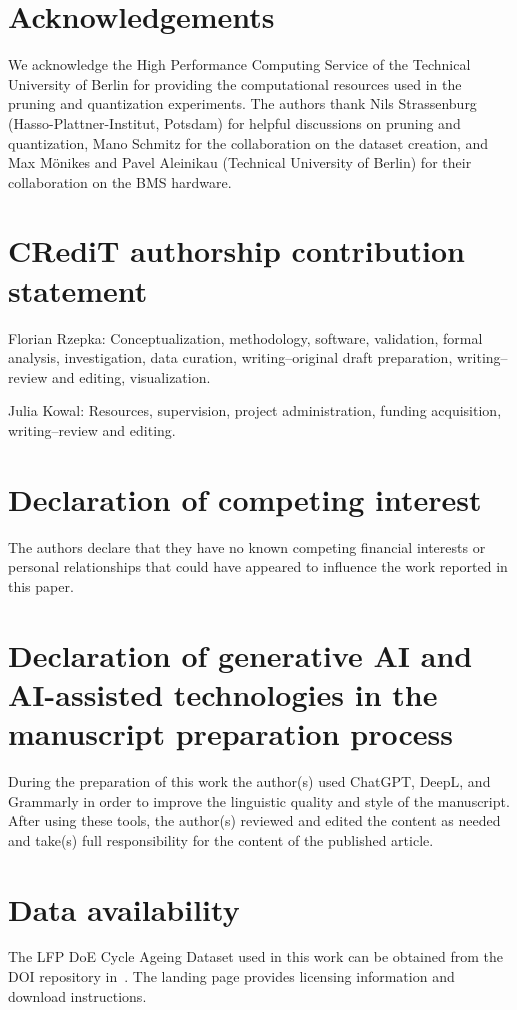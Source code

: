\documentclass[final,3p,times]{elsarticle}
\begin{document}
\section*{Acknowledgements}
We acknowledge the High Performance Computing Service of the Technical University of Berlin for providing the computational resources used in the pruning and quantization experiments. The authors thank Nils Strassenburg (Hasso-Plattner-Institut, Potsdam) for helpful discussions on pruning and quantization, Mano Schmitz for the collaboration on the dataset creation, and Max M\"onikes and Pavel Aleinikau (Technical University of Berlin) for their collaboration on the BMS hardware.
\section*{CRediT authorship contribution statement}
Florian Rzepka: Conceptualization, methodology, software, validation, formal analysis, investigation, data curation, writing--original draft preparation, writing--review and editing, visualization.

Julia Kowal: Resources, supervision, project administration, funding acquisition, writing--review and editing.

\section*{Declaration of competing interest}
The authors declare that they have no known competing financial interests or personal relationships that could have appeared to influence the work reported in this paper.
\section*{Declaration of generative AI and AI-assisted technologies in the manuscript preparation process}
During the preparation of this work the author(s) used ChatGPT, DeepL, and Grammarly in order to improve the linguistic quality and style of the manuscript. After using these tools, the author(s) reviewed and edited the content as needed and take(s) full responsibility for the content of the published article.

\section*{Data availability}
The LFP DoE Cycle Ageing Dataset used in this work can be obtained from the DOI repository in~\cite{LFP_DoE_Cycle_Aging_Dataset}. The landing page provides licensing information and download instructions.



\end{document}
